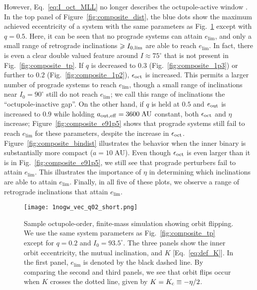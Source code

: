 \documentclass[
        fleqn,
        usenatbib,
    ]{mnras}
\newlength{\colummwidth}
\begin{document}
However, Eq.~\eqref{eq:I_oct_MLL} no longer describes the octupole-active window
\citep[see also][]{rodet_inprep}. In the top panel of
Figure~\ref{fig:composite_dist}, the blue dots show the maximum achieved
eccentricity of a system with the same parameters as
Fig.~\ref{fig:nogw_fiducial} except with $q = 0.5$. Here, it can be seen that no
prograde systems can attain $e_{\lim}$, and only a small range of retrograde
inclinations $\geq I_{\rm 0, \lim}$ are able to reach $e_{\lim}$. In fact, there
is even a clear double valued feature around $I \approx 75^\circ$ that is not
present in Fig.~\ref{fig:composite_tp}. If $q$ is decreased to $0.3$
(Fig.~\ref{fig:composite_1p3}) or further to $0.2$
(Fig.~\ref{fig:composite_1p2}), $\epsilon_{\rm oct}$ is increased. This permits
a larger number of prograde systems to reach $e_{\lim}$, though a small range of
inclinations near $I_0 = 90^\circ$ still do not reach $e_{\lim}$; we call this
range of inclinations the ``octupole-inactive gap''. On the other hand, if $q$
is held at $0.5$ and $e_{\rm out}$ is increased to $0.9$ while holding $a_{\rm
out, eff} = 3600\;\mathrm{AU}$ constant, both $\epsilon_{\rm oct}$ and $\eta$
increase; Figure~\ref{fig:composite_e91p5} shows that prograde systems still
fail to reach $e_{\lim}$ for these parameters, despite the increase in
$\epsilon_{\rm oct}$. Figure~\ref{fig:composite_bindist} illustrates
the behavior when the inner binary is substantially more compact ($a =
10\;\mathrm{AU}$). Even though $\epsilon_{\rm oct}$ is even larger than it is in
Fig.~\ref{fig:composite_e91p5}, we still see that prograde perturbers fail to
attain $e_{\lim}$. This illustrates the importance of $\eta$ in determining
which inclinations are able to attain $e_{\lim}$. Finally, in all five of these
plots, we observe a range of retrograde inclinations that attain $e_{\lim}$.

\begin{figure}
    \centering
    \texttt{[image: 1nogw\_vec\_q02\_short.png]}
    \caption{Sample octupole-order, finite-mass simulation showing orbit
    flipping. We use the same system parameters as Fig.~\ref{fig:composite_tp}
    except for $q = 0.2$ and $I_0 = 93.5^\circ$. The three panels show the
    inner orbit eccentricity, the mutual inclination, and $K$
    [Eq.~\eqref{eq:def_K}]. In the first panel, $e_{\lim}$ is denoted by the
    black dashed line. By comparing the second and third panels, we see that
    orbit flips occur when $K$ crosses the dotted line, given by $K = K_{\rm c}
    \equiv -\eta / 2$.
    }\label{fig:nogw_fiducial}
\end{figure}
\end{document}
